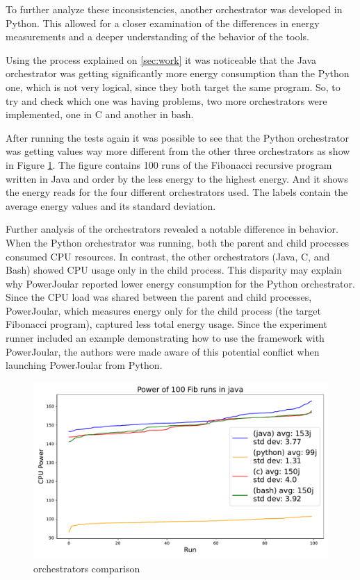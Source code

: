 To further analyze these inconsistencies, another orchestrator was developed in Python. This allowed for a closer examination of the differences in energy measurements and a deeper understanding of the behavior of the tools.

Using the process explained on \ref{sec:work} it was noticeable that the Java orchestrator was getting significantly more energy consumption than the Python one, which is not very logical, since they both target the same program. So, to try and check which one was having problems, two more orchestrators were implemented, one in C and another in bash.

After running the tests again it was possible to see that the Python orchestrator was getting values way more different from the other three orchestrators as show in Figure \ref{fig:4_orchs_comparison}.
The figure contains 100 runs of the Fibonacci recursive program written in Java and order by the less energy to the highest energy. And it shows the energy reads for the four different orchestrators used. The labels contain the average energy values and its standard deviation.

Further analysis of the orchestrators revealed a notable difference in behavior. When the Python orchestrator was running, both the parent and child processes consumed CPU resources. In contrast, the other orchestrators (Java, C, and Bash) showed CPU usage only in the child process. This disparity may explain why PowerJoular reported lower energy consumption for the Python orchestrator. Since the CPU load was shared between the parent and child processes, PowerJoular, which measures energy only for the child process (the target Fibonacci program), captured less total energy usage.
Since the experiment runner included an example demonstrating how to use the framework with PowerJoular, the authors were made aware of this potential conflict when launching PowerJoular from Python.

\begin{figure}%
  \centering
  \includegraphics[width = 0.5 \textwidth]{figures/4_orchestrators_comparison.pdf}
  \caption{orchestrators comparison}
  \label{fig:4_orchs_comparison}
\end{figure}